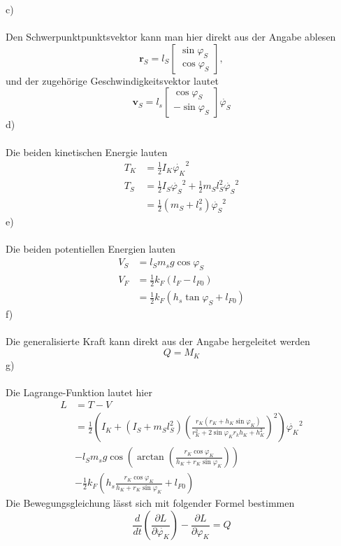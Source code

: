 c) \\ \\
Den Schwerpunktpunktsvektor kann man hier direkt aus der Angabe ablesen
\[
	\textbf{r}_S = l_S \begin{bmatrix}
		\sin\varphi_S \\
		\cos\varphi_S
	\end{bmatrix},
\]
und der zugehörige Geschwindigkeitsvektor lautet
\[
	\textbf{v}_S = l_s\begin{bmatrix}
		\cos\varphi_S \\
		-\sin\varphi_S
	\end{bmatrix}
	\dot{\varphi_S}
\]
d) \\ \\
Die beiden kinetischen Energie lauten
\begin{align*}
	T_K &= \frac{1}{2} I_K \dot{\varphi_K}^2 \\
	T_S &= \frac{1}{2}I_S\dot{\varphi_S}^2 + \frac{1}{2}m_Sl_S^2\dot{\varphi_S}^2 \\
	    &= \frac{1}{2}(m_S + l_s^2)\dot{\varphi_S}^2
\end{align*}
e)\\ \\
Die beiden potentiellen Energien lauten
\begin{align*}
	V_S &= l_Sm_sg\cos\varphi_S \\
	V_F &= \frac{1}{2}k_F(l_F - l_{F0}) \\
	    &= \frac{1}{2}k_F(h_s\tan\varphi_S + l_{F0})
\end{align*}
f) \\ \\
Die generalisierte Kraft kann direkt aus der Angabe hergeleitet werden
\[
	Q = M_K
\]
g)\\ \\
Die Lagrange-Funktion lautet hier
\begin{align*}
	L &= T - V \\
	  &= \frac{1}{2}\left(I_K +(I_S + m_Sl_S^2)\left( \frac{r_K(r_K + h_K\sin\varphi_K)}{r_K^2 + 2\sin\varphi_Kr_kh_K + h_K^2}\right)^2\right)\dot{\varphi_K}^2 \\
	  &- l_Sm_sg\cos\left( \arctan\left( \frac{r_K\cos\varphi_K}{h_K + r_K\sin\varphi_K}\right)\right) \\
	  &- \frac{1}{2}k_F\left(h_s \frac{r_K\cos\varphi_K}{h_K + r_K\sin\varphi_K} + l_{F0}\right)
\end{align*}
Die Bewegungsgleichung lässt sich mit folgender Formel bestimmen
\[
	\frac{d}{dt}\left(\frac{\partial L}{\partial \dot{\varphi_K}}\right) - \frac{\partial L}{\partial \varphi_K} = Q
\]